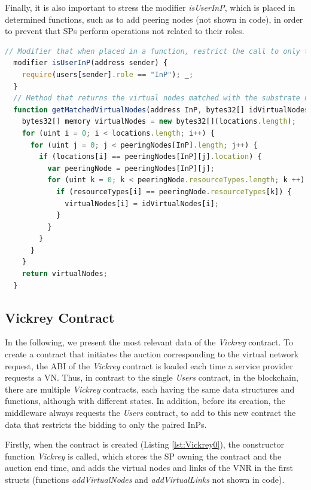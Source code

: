 Finally, it is also important to stress the modifier \textit{isUserInP}, which is placed in determined functions, such as to add peering nodes (not shown in code), in order to prevent that SPs perform operations not related to their roles. 
\newline

\begin{lstlisting}[language=JavaScript,caption={Function to get the paired virtual nodes in the Users contract.}, label={lst:UserContract3}]
  // Modifier that when placed in a function, restrict the call to only the InPs
  modifier isUserInP(address sender) {
    require(users[sender].role == "InP"); _;
  }
  // Method that returns the virtual nodes matched with the substrate networks
  function getMatchedVirtualNodes(address InP, bytes32[] idVirtualNodes, bytes32[] locations, bytes32[] resourceTypes) public constant returns (bytes32[]) {
    bytes32[] memory virtualNodes = new bytes32[](locations.length);
    for (uint i = 0; i < locations.length; i++) {
      for (uint j = 0; j < peeringNodes[InP].length; j++) {
        if (locations[i] == peeringNodes[InP][j].location) {
          var peeringNode = peeringNodes[InP][j];
          for (uint k = 0; k < peeringNode.resourceTypes.length; k ++) {
            if (resourceTypes[i] == peeringNode.resourceTypes[k]) {
              virtualNodes[i] = idVirtualNodes[i];
            }
          }
        }
      }
    }
    return virtualNodes;
  }
\end{lstlisting}

\subsection{Vickrey Contract} \label{vickreyContract}

In the following, we present the most relevant data of the \textit{Vickrey} contract. To create a contract that initiates the auction corresponding to the virtual network request, the ABI of the \textit{Vickrey} contract is loaded each time a service provider requests a VN. Thus, in contrast to the single \textit{Users} contract, in the blockchain, there are multiple \textit{Vickrey} contracts, each having the same data structures and functions, although with different states. In addition, before its creation, the middleware always requests the \textit{Users} contract, to add to this new contract the data that restricts the bidding to only the paired InPs.

Firstly, when the contract is created (Listing \ref{lst:Vickrey0}), the constructor function \textit{Vickrey} is called, which stores the SP owning the contract and the auction end time, and adds the virtual nodes and links of the VNR in the first structs (functions \textit{addVirtualNodes} and \textit{addVirtualLinks} not shown in code). \newline

